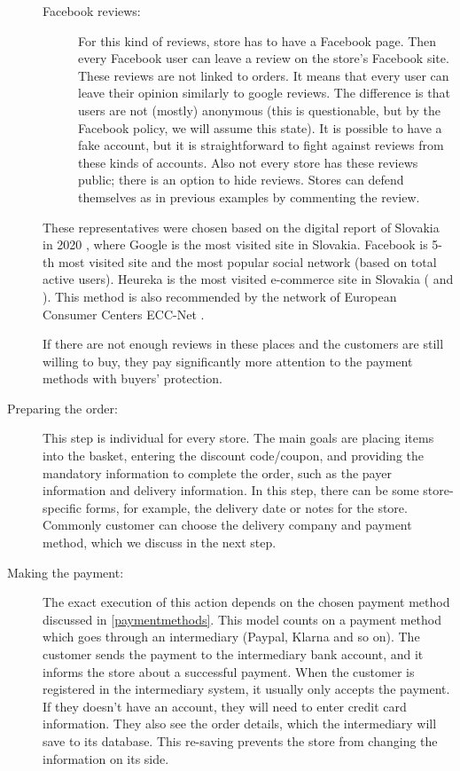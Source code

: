 \documentclass[thesis=M,english]{FITthesis}[2019/12/23]
\begin{document}
\begin{description}
\begin{description}
\item[Facebook reviews:]
For this kind of reviews, store has to have a Facebook page. Then every Facebook user can leave a review on the store's Facebook site. These reviews are not linked to orders. It means that every user can leave their opinion similarly to google reviews. The difference is that users are not (mostly) anonymous (this is questionable, but by the Facebook policy, we will assume this state). It is possible to have a fake account, but it is straightforward to fight against reviews from these kinds of accounts. Also not every store has these reviews public; there is an option to hide reviews. Stores can defend themselves as in previous examples by commenting the review. \cite{facebookReviews}



\end{description}

These representatives were chosen based on the digital report of Slovakia in 2020 \cite{dataportal}, where Google is the most visited site in Slovakia. Facebook is 5-th most visited site and the most popular social network (based on total active users). Heureka is the most visited e-commerce site in Slovakia (\cite{similarHeureka} and \cite{heurekaPropag}). This method is also recommended by the network of European Consumer Centers ECC-Net \cite{ecc}.

If there are not enough reviews in these places and the customers are still willing to buy, they pay significantly more attention to the payment methods with buyers' protection.


\item[Preparing the order:]
This step is individual for every store. The main goals are placing items into the basket, entering the discount code/coupon, and providing the mandatory information to complete the order, such as the payer information and delivery information. In this step, there can be some store-specific forms, for example, the delivery date or notes for the store. Commonly customer can choose the delivery company and payment method, which we discuss in the next step.

\item[Making the payment:]
The exact execution of this action depends on the chosen payment method discussed in \ref{paymentmethods}. This model counts on a payment method which goes through an intermediary (Paypal, Klarna and so on). The customer sends the payment to the intermediary bank account, and it informs the store about a successful payment. When the customer is registered in the intermediary system, it usually only accepts the payment. If they doesn't have an account, they will need to enter credit card information. They also see the order details, which the intermediary will save to its database. This re-saving prevents the store from changing the information on its side.



\end{description}
\end{document}
